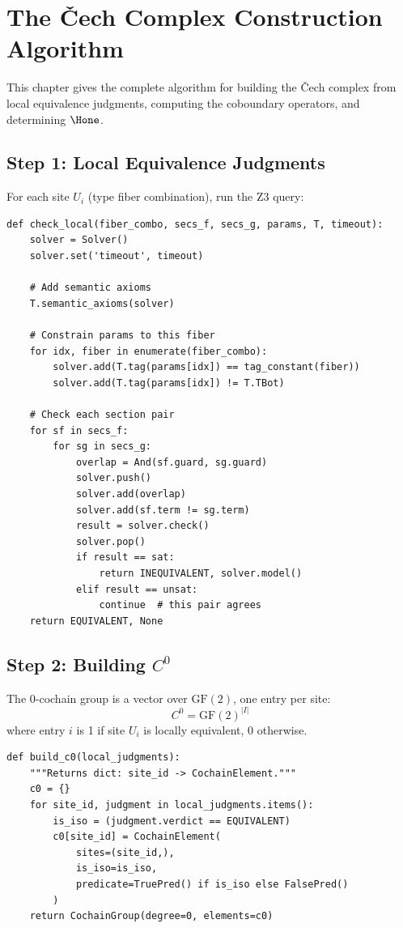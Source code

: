 \chapter{The \v{C}ech Complex Construction Algorithm}
\label{ch:cech-algorithm}

This chapter gives the complete algorithm for building the \v{C}ech
complex from local equivalence judgments, computing the coboundary
operators, and determining $\Hone$.

\section{Step 1: Local Equivalence Judgments}

For each site $U_i$ (type fiber combination), run the Z3 query:

\begin{lstlisting}[caption={Local equivalence check}]
def check_local(fiber_combo, secs_f, secs_g, params, T, timeout):
    solver = Solver()
    solver.set('timeout', timeout)

    # Add semantic axioms
    T.semantic_axioms(solver)

    # Constrain params to this fiber
    for idx, fiber in enumerate(fiber_combo):
        solver.add(T.tag(params[idx]) == tag_constant(fiber))
        solver.add(T.tag(params[idx]) != T.TBot)

    # Check each section pair
    for sf in secs_f:
        for sg in secs_g:
            overlap = And(sf.guard, sg.guard)
            solver.push()
            solver.add(overlap)
            solver.add(sf.term != sg.term)
            result = solver.check()
            solver.pop()
            if result == sat:
                return INEQUIVALENT, solver.model()
            elif result == unsat:
                continue  # this pair agrees
    return EQUIVALENT, None
\end{lstlisting}

\section{Step 2: Building $C^0$}

The 0-cochain group is a vector over $\mathrm{GF}(2)$, one entry per
site:
\[
  C^0 = \mathrm{GF}(2)^{|I|}
\]
where entry $i$ is 1 if site $U_i$ is locally equivalent, 0 otherwise.

\begin{lstlisting}[caption={Building $C^0$}]
def build_c0(local_judgments):
    """Returns dict: site_id -> CochainElement."""
    c0 = {}
    for site_id, judgment in local_judgments.items():
        is_iso = (judgment.verdict == EQUIVALENT)
        c0[site_id] = CochainElement(
            sites=(site_id,),
            is_iso=is_iso,
            predicate=TruePred() if is_iso else FalsePred()
        )
    return CochainGroup(degree=0, elements=c0)
\end{lstlisting}

